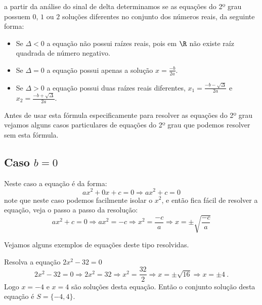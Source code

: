 
a partir da análise do sinal de delta determinamos se as equações do 2º grau possuem $0$, $1$ ou $2$ soluções diferentes no conjunto dos números reais, da seguinte forma:
\begin{itemize}
\item Se $\Delta < 0$ a equação não possui raízes reais, pois em $\R$ não existe raíz quadrada de número negativo.
\item Se $\Delta = 0$ a equação possui apenas a solução $x= \frac{-b}{2a}$.
\item Se $\Delta > 0$ a equação possui duas raízes reais diferentes, $x_1= \frac{-b - \sqrt{\Delta}}{2a}$ e $x_2= \frac{-b + \sqrt{\Delta}}{2a}$.
\end{itemize}


Antes de usar esta fórmula especificamente para resolver as equações do 2º grau vejamos alguns casos particulares de equações do 2º grau que podemos resolver sem esta fórmula.

 \subsection{Caso \texorpdfstring{$b=0$}{b=0}}

 Neste caso a equação é da forma:
\begin{equation}
ax^2 + 0x + c= 0 \Rightarrow ax^2 + c= 0
\end{equation}
 note que neste caso podemos facilmente isolar o $x^2$, e então fica fácil de resolver a equação, veja o passo a passo da resolução:
\begin{equation}
ax^2 + c= 0 \Rightarrow ax^2= -c \Rightarrow x^2= \frac{-c}{a} \Rightarrow x= \pm \sqrt{\frac{-c}{a}}
\end{equation}

 Vejamos alguns exemplos de equações deste tipo resolvidas.
 
 \begin{exem} 
 Resolva a equação $2x^2 - 32=0$
\begin{equation}
2x^2 - 32=0 \Rightarrow 2x^2= 32 \Rightarrow x^2= \frac{32}{2} \Rightarrow x= \pm \sqrt{16} \Rightarrow x= \pm 4 \ .
\end{equation}
 Logo $x= -4$ e $x= 4$ são soluções desta equação. Então o conjunto solução desta equação é $S= \{-4, 4\}$.
 \end{exem}
 
